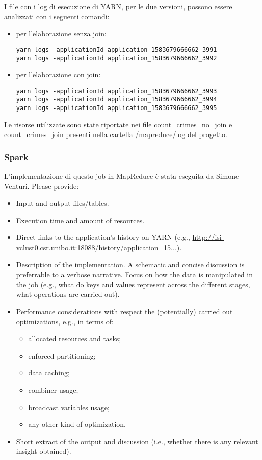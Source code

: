 \documentclass[10pt]{article}
\begin{document}
I file con i log di esecuzione di YARN, per le due versioni, possono essere analizzati con i seguenti comandi:
\begin{itemize}
\item per l'elaborazione senza join: 
\begin{lstlisting}
yarn logs -applicationId application_1583679666662_3991
yarn logs -applicationId application_1583679666662_3992
\end{lstlisting}
\item per l'elaborazione con join:
\begin{lstlisting}
yarn logs -applicationId application_1583679666662_3993
yarn logs -applicationId application_1583679666662_3994
yarn logs -applicationId application_1583679666662_3995
\end{lstlisting}
\end{itemize}
Le risorse utilizzate sono state riportate nei file count_crimes_no_join e count_crimes_join presenti nella cartella /mapreduce/log del progetto.

\subsubsection{Spark}
L'implementazione di questo job in MapReduce è stata eseguita da Simone Venturi.
Please provide:
\begin{itemize}
\item Input and output files/tables.
\item Execution time and amount of resources.
\item Direct links to the application's history on YARN (e.g., \url{http://isi-vclust0.csr.unibo.it:18088/history/application_15...}).
\item Description of the implementation. A schematic and concise discussion is preferrable to a verbose narrative. Focus on how the data is manipulated in the job (e.g., what do keys and values represent across the different stages, what operations are carried out). 
\item Performance considerations with respect the (potentially) carried out optimizations, e.g., in terms of:
\begin{itemize}
\item allocated resources and tasks;
\item enforced partitioning;
\item data caching;
\item combiner usage;
\item broadcast variables usage;
\item any other kind of optimization.
\end{itemize}
\item Short extract of the output and discussion (i.e., whether there is any relevant insight obtained).
\end{itemize}
\end{document}
